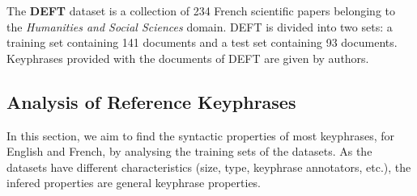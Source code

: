     The \textbf{DEFT} dataset \cite{Paroubek2012deft} is a collection of 234
    French scientific papers belonging to the \textit{Humanities and Social
    Sciences} domain. DEFT is divided into two sets: a training set containing
    141 documents and a test set containing 93 documents. Keyphrases provided
    with the documents of DEFT are given by authors.

  \subsection{Analysis of Reference Keyphrases}
  \label{subsec:keyphrase_analysis}
    In this section, we aim to find the syntactic properties of most keyphrases,
    for English and French, by analysing the training sets of the datasets. As
    the datasets have different characteristics (size, type, keyphrase
    annotators, etc.), the infered properties are general keyphrase properties.

